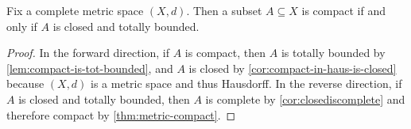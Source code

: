 \documentclass[../notes.tex]{subfiles}
\begin{document}
\begin{corollary} \label{cor:metric-compact}
	Fix a complete metric space $(X,d)$. Then a subset $A\subseteq X$ is compact if and only if $A$ is closed and totally bounded.
\end{corollary}
\begin{proof}
	In the forward direction, if $A$ is compact, then $A$ is totally bounded by \autoref{lem:compact-is-tot-bounded}, and $A$ is closed by \autoref{cor:compact-in-haus-is-closed} because $(X,d)$ is a metric space and thus Hausdorff. In the reverse direction, if $A$ is closed and totally bounded, then $A$ is complete by \autoref{cor:closediscomplete} and therefore compact by \autoref{thm:metric-compact}.
\end{proof}
\end{document}
